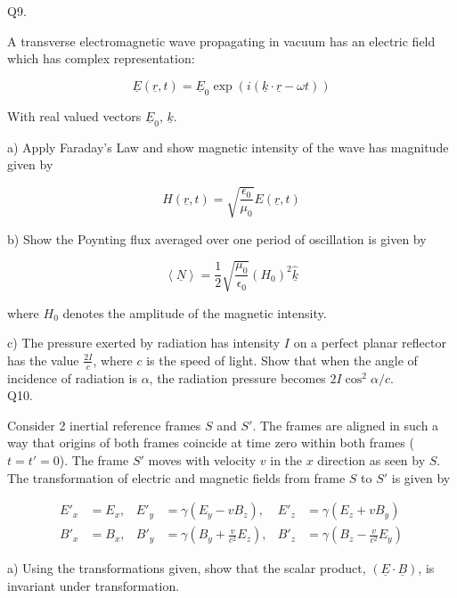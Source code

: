 \documentclass[a4paper,11pt]{article}
\begin{document}
\bigskip

Q9. 

A transverse electromagnetic wave propagating in vacuum has an electric field which has complex representation:

\[ \underline{E}(\underline{r}, t) = \underline{E}_{0} \exp (i(\underline{k} \cdot \underline{r} - \omega t)) \]

With real valued vectors \( \underline{E}_{0} \), \( \underline{k} \).

\medskip 

a) Apply Faraday’s Law and show magnetic intensity of the wave has magnitude given by 

\[ H(\underline{r}, t) = \sqrt{\frac{\epsilon_{0}}{\mu_{0}}} E(\underline{r}, t) \]

\medskip

b) Show the Poynting flux averaged over one period of oscillation is given by 

\[ \left< \underline{N} \right> = \frac{1}{2} \sqrt{\frac{\mu_{0}}{\epsilon_{0}}} (H_{0})^{2} \hat{\underline{k}} \]

where \( H_{0} \) denotes the amplitude of the magnetic intensity.

c) The pressure exerted by radiation has intensity \( I \) on a perfect planar reflector has the value \( \frac{2I}{c} \), where \( c \) is the speed of light. Show that when the angle of incidence of radiation is \( \alpha \), the radiation pressure becomes \( 2I\cos^{2}{\alpha}/{c} \).\\

Q10. 

Consider 2 inertial reference frames \( S \) and \( S' \). The frames are aligned in such a way that origins of both frames coincide at time zero within both frames (\( t = t' = 0 \)). The frame \( S' \) moves with velocity \( v \) in the \( x \) direction as seen by \( S \). The transformation of electric and magnetic fields from frame \( S \) to \( S' \) is given by 

\[
\begin{aligned}
E'_{x} &= E_{x}, & E'_{y} &= \gamma(E_{y} - vB_{z}), & E'_{z} &= \gamma(E_{z} + vB_{y}) \\
B'_{x} &= B_{x}, & B'_{y} &= \gamma(B_{y} + \frac{v}{c^{2}} E_{z}), & B'_{z} &= \gamma(B_{z} - \frac{v}{c^{2}} E_{y})
\end{aligned}
\]

\medskip

a) Using the transformations given, show that the scalar product, \( (\underline{E} \cdot \underline{B}) \), is invariant under transformation.
\end{document}
